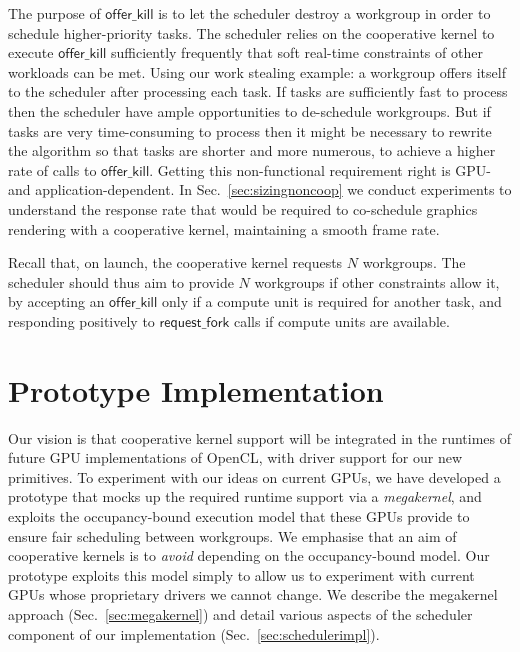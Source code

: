 \documentclass[sigconf]{acmart}
\makeatletter
\renewcommand\paragraph{\@startsection{paragraph}{4}{\z@}%
  {-.5\baselineskip \@plus -2\p@ \@minus -.2\p@}%
  {-3.5\p@}%
  {\bfseries\@parfont}}
\newcommand{\mysec}{Sec.~}
\newcommand{\offerfork}{\mathsf{request\_fork}}
\newcommand{\offerkill}{\mathsf{offer\_kill}}
\makeatother
\begin{document}
{The purpose of $\offerkill$ is to let the scheduler destroy a workgroup
in order to schedule higher-priority tasks.  The scheduler relies on the
cooperative kernel to execute $\offerkill$ sufficiently frequently that
soft real-time constraints of other workloads can be met.
%
Using our work stealing example: a workgroup offers itself to
the scheduler after processing each task.  If tasks are sufficiently
fast to process then the scheduler have ample opportunities to
de-schedule workgroups.  But if tasks are very time-consuming to
process then it might be necessary to rewrite the algorithm so that
tasks are shorter and more numerous, to achieve a higher rate of calls
to $\offerkill$.
%
Getting this non-functional requirement right is GPU- and
application-dependent.  In \mysec\ref{sec:sizingnoncoop} we conduct
experiments to understand the response rate that would be required to
co-schedule graphics rendering with a cooperative kernel, maintaining
a smooth frame rate.


Recall that, on launch, the cooperative kernel requests $N$ workgroups.
The scheduler should thus aim to provide $N$ workgroups if other constraints allow it,
by accepting an $\offerkill$ only if a compute unit is required for another
task, and responding positively to $\offerfork$ calls if compute units are available.





\section{Prototype Implementation}\label{sec:implementation}

Our vision is that cooperative kernel support will be integrated
in the runtimes of future GPU implementations of OpenCL, with driver
support for our new primitives.  To experiment with our ideas on
current GPUs, we have developed a prototype that mocks up the required
runtime support via a \emph{megakernel}, and exploits the
occupancy-bound execution model that these GPUs provide to ensure fair
scheduling between workgroups.  We emphasise that an aim of
cooperative kernels is to \emph{avoid} depending on the
occupancy-bound model.  Our prototype exploits this model simply to
allow us to experiment with current GPUs whose proprietary drivers we
cannot change.  We describe the megakernel approach
(\mysec\ref{sec:megakernel}) and detail various aspects of the
scheduler component of our implementation
(\mysec\ref{sec:schedulerimpl}).

}
\end{document}
